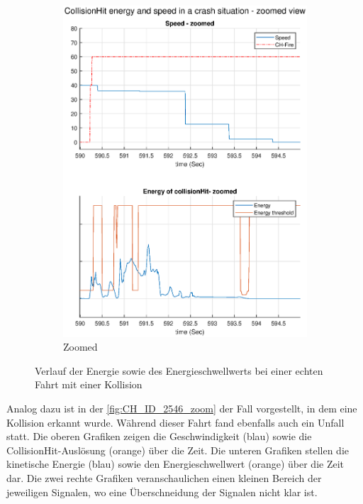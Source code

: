 \begin{figure}[H]
\begin{subfigure}{0.41\textwidth}
		\includegraphics[width=\textwidth]{Bilder/CH_speed_CHEnergy_MitCH_zoomed_eps.eps}
		\caption{Zoomed}
		\label{fig:CH_speed_CHEnergy_MitCH_zoomed_eps}
	\end{subfigure}
	\caption{Verlauf der Energie sowie des Energieschwellwerts bei einer echten Fahrt mit einer Kollision}
	\label{fig:CH_ID_2546_zoom}
\end{figure}


Analog dazu ist in der \autoref{fig:CH_ID_2546_zoom} der Fall vorgestellt, in dem eine Kollision erkannt wurde. Während dieser Fahrt fand ebenfalls auch ein Unfall statt. 
Die oberen Grafiken zeigen die Geschwindigkeit (blau) sowie die CollisionHit-Auslösung (orange) über die Zeit.
Die unteren Grafiken stellen die kinetische Energie (blau) sowie den Energieschwellwert (orange) über die Zeit dar.
Die zwei rechte Grafiken veranschaulichen einen kleinen Bereich der jeweiligen Signalen, wo eine Überschneidung der Signalen nicht klar ist.




